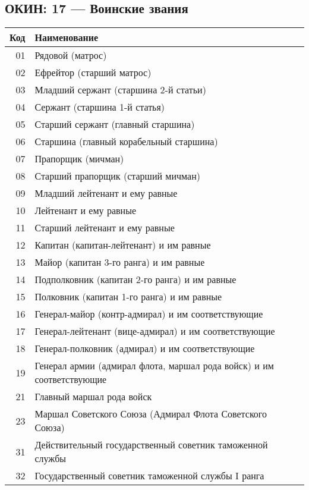 \documentclass[10pt, a4paper, titlepage]{article}
\begin{document}
\subsection{ОКИН: 17 --- Воинские звания}

\begin{center}
    \begin{longtable}{rp{}}
        \hline
        \textbf{Код} & \textbf{Наименование} \\ \hline
        01 & Рядовой (матрос) \\
        02 & Ефрейтор (старший матрос) \\
        03 & Младший сержант (старшина 2-й статьи) \\
        04 & Сержант (старшина 1-й статья) \\
        05 & Старший сержант (главный старшина) \\
        06 & Старшина (главный корабельный старшина) \\
        07 & Прапорщик (мичман) \\
        08 & Старший прапорщик (старший мичман) \\
        09 & Младший лейтенант и ему равные \\
        10 & Лейтенант и ему равные \\
        11 & Старший лейтенант и ему равные \\
        12 & Капитан (капитан-лейтенант) и им равные \\
        13 & Майор (капитан 3-го ранга) и им равные \\
        14 & Подполковник (капитан 2-го ранга) и им равные \\
        15 & Полковник (капитан 1-го ранга) и им равные \\
        16 & Генерал-майор (контр-адмирал) и им соответствующие \\
        17 & Генерал-лейтенант (вице-адмирал) и им соответствующие \\
        18 & Генерал-полковник (адмирал) и им соответствующие \\
        19 & Генерал армии (адмирал флота, маршал рода войск) и им соответствующие \\
        21 & Главный маршал рода войск \\
        23 & Маршал Советского Союза (Адмирал Флота Советского Союза) \\
        31 & Действительный государственный советник таможенной службы \\
        32 & Государственный советник таможенной службы I ранга \\

\end{longtable}
\end{center}
\end{document}
